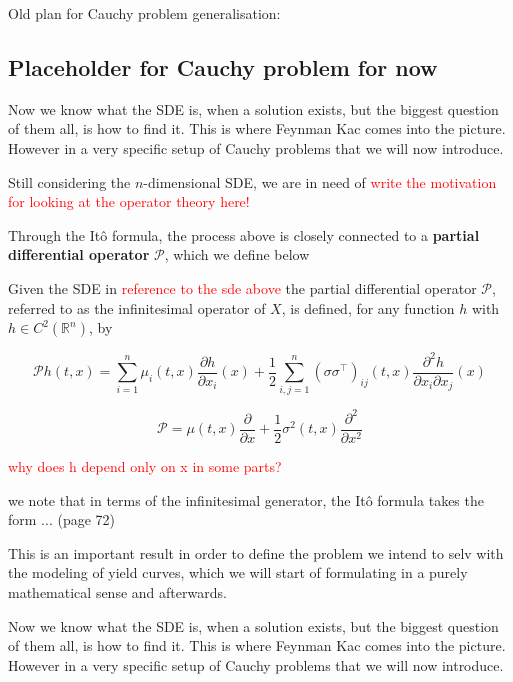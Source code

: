 Old plan for Cauchy problem generalisation:


\subsection{Placeholder for Cauchy problem for now}

Now we know what the SDE is, when a solution exists, but the biggest question of them all, is how to find it. This is where Feynman Kac comes into the picture. However in a very specific setup of Cauchy problems that we will now introduce.


Still considering the $n$-dimensional SDE, we are in need of \textcolor{red}{write the motivation for looking at the operator theory here!}

Through the Itô formula, the process above is closely connected to a \textbf{partial differential operator} $\mathcal{P}$, which we define below

\begin{definition}
    Given the SDE in \textcolor{red}{reference to the sde above} the partial differential operator $\mathcal{P}$, referred to as the infinitesimal operator of $X$, is defined, for any function $h$ with $h\in C^2(\mathbb{R}^n)$, by

    \begin{equation}
        \mathcal{P} h(t,x)= \sum_{i=1}^{n} \mu_i(t,x) \frac{\partial h}{\partial x_i} (x) + \frac{1}{2} \sum_{i,j=1}^{n} (\sigma \sigma^\top)_{ij}(t,x) \frac{\partial^2 h}{\partial x_i \partial x_j}(x)
    \end{equation}

    \begin{equation}
        \mathcal{P} = \mu(t,x)\frac{\partial}{\partial x} + \frac{1}{2}\sigma^2(t,x)\frac{\partial^2}{\partial x^2}
    \end{equation}
\end{definition}
\textcolor{red}{why does h depend only on x in some parts?}

we note that in terms of the infinitesimal generator, the Itô formula takes the form
... (page 72)


This is an important result in order to define the problem we intend to selv with the modeling of yield curves, which we will start of formulating in a purely mathematical sense and afterwards.

Now we know what the SDE is, when a solution exists, but the biggest question of them all, is how to find it. This is where Feynman Kac comes into the picture. However in a very specific setup of Cauchy problems that we will now introduce.

